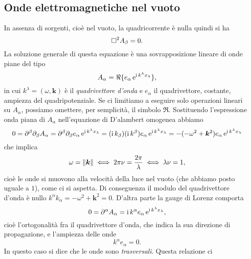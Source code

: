 \subsection{Onde elettromagnetiche nel vuoto}
\label{sec:onde-elettromagnetiche-vuoto}

In assenza di sorgenti, cioè nel vuoto, la quadricorrente è nulla quindi si ha
\begin{equation}
  \label{eq:maxwell-vuoto-lorenz}
  \Box^{2} A_{\beta} = 0.
\end{equation}
La soluzione generale di questa equazione è una sovrapposizione lineare di onde
piane del tipo
\begin{equation}
  A_{\alpha} = \Re \{e_{\alpha} \operatorname{\mathrm{e}}^{\operatorname{\mathrm{i}} k^{\lambda} x_{\lambda}}\},
\end{equation}
in cui $k^{\lambda} = (\omega, \bm{k})$ è il
\emph{quadrivettore d'onda} e $e_{\alpha}$ il
quadrivettore, costante, ampiezza del quadripotenziale.  Se ci limitiamo a
eseguire solo operazioni lineari su $A_{\alpha}$, possiamo omettere, per
semplicità, il simbolo $\Re$.  Sostituendo l'espressione onda piana di
$A_{\alpha}$ nell'equazione di D'alambert omogenea abbiamo
\begin{equation}
  0 = \partial^{\beta}\partial_{\beta} A_{\alpha} = \partial^{\beta}\partial_{\beta}
  e_{\alpha} \operatorname{\mathrm{e}}^{\operatorname{\mathrm{i}} k^{\lambda} x_{\lambda}} = (\operatorname{\mathrm{i}} k_{\beta})(\operatorname{\mathrm{i}}
  k^{\beta}) e_{\alpha} \operatorname{\mathrm{e}}^{\operatorname{\mathrm{i}} k^{\lambda} x_{\lambda}} = -(-\omega^{2} +
  \bm{k}^{2}) e_{\alpha} \operatorname{\mathrm{e}}^{\operatorname{\mathrm{i}} k^{\lambda} x_{\lambda}}
\end{equation}
che implica
\begin{equation}
  \omega = \lVert\bm{k}\rVert \iff 2\pi\nu = \frac{2\pi}{\lambda} \iff \lambda\nu=1,
\end{equation}
cioè le onde si muovono alla velocità della luce nel vuoto (che abbiamo posto
uguale a $1$), come ci si aspetta.  Di conseguenza il modulo del quadrivettore
d'onda è nullo $k^{\alpha}k_{\alpha} = -\omega^{2} + \bm{k}^{2} = 0$.  D'altra
parte la gauge di Lorenz comporta
\begin{equation}
  0 = \partial^{\alpha} A_{\alpha} = \operatorname{\mathrm{i}} k^{\alpha} e_{\alpha} \operatorname{\mathrm{e}}^{\operatorname{\mathrm{i}}
    k^{\lambda}x_{\lambda}},
\end{equation}
cioè l'ortogonalità fra il quadrivettore d'onda, che indica la sua direzione di
propagazione, e l'ampiezza delle onde
\begin{equation}
  k^{\alpha} e_{\alpha} = 0.
\end{equation}
In questo caso si dice che le onde sono \emph{trasversali}.  Questa relazione ci
